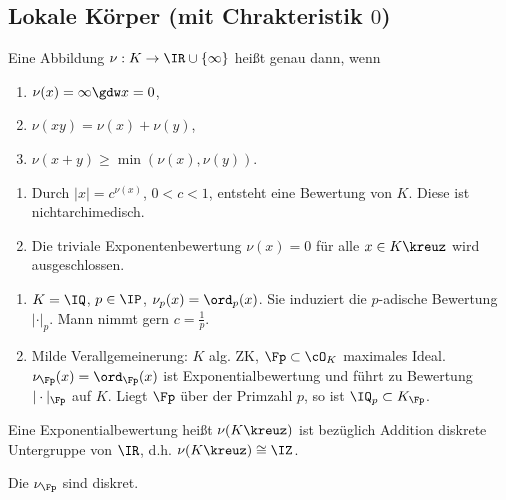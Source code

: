 \subsection{Lokale Körper (mit Chrakteristik $0$)}

\begin{Definition}
 Eine Abbildung $\nu:K\rightarrow \IR\cup\{\infty\}$ heißt  genau dann, wenn
 \begin{enumerate}
  \item $\nu(x)=\infty\gdw x=0$,
  \item $\nu(xy)=\nu(x)+\nu(y)$,
  \item $\nu(x+y)\geq \min(\nu(x),\nu(y))$.
 \end{enumerate}
\end{Definition}

\begin{Bemerkung}
 \begin{enumerate}
  \item Durch $|x|=c^{\nu(x)}$, $0<c<1$, entsteht eine Bewertung von $K$. Diese ist nichtarchimedisch.
  \item Die triviale Exponentenbewertung $\nu(x)=0$ für alle $x\in K\kreuz$ wird ausgeschlossen.
 \end{enumerate}
\end{Bemerkung}

 \begin{Beispiel}
  \begin{enumerate}
   \item $K=\IQ$, $p\in\IP$, $\nu_p(x)=\ord_p(x)$. Sie induziert die $p$-adische Bewertung $|\cdot|_p$. Mann nimmt gern $c=\frac{1}{p}$.
   \item Milde Verallgemeinerung: $K$ alg. ZK, $\Fp\subset\cO_K$ maximales Ideal. $\nu_\Fp(x)=\ord_\Fp(x)$ ist Exponentialbewertung und führt zu Bewertung $|\cdot|_\Fp$ auf $K$. Liegt $\Fp$ über der Primzahl $p$, so ist $\IQ_p\subset K_\Fp$.
  \end{enumerate}
 \end{Beispiel}

\begin{Definition}
 Eine Exponentialbewertung heißt  \gdw $\nu(K\kreuz)$ ist bezüglich Addition diskrete Untergruppe von $\IR$, d.h. $\nu(K\kreuz)\cong \IZ$.
\end{Definition}

\begin{Beispiel}
 Die $\nu_\Fp$ sind diskret.
\end{Beispiel}

